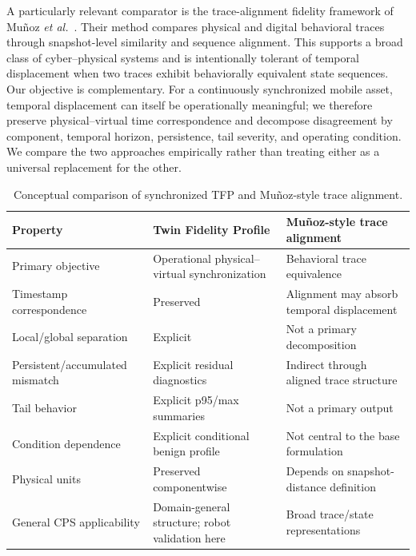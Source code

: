
A particularly relevant comparator is the trace-alignment fidelity framework
of Mu\~noz \emph{et al.}~\cite{munoz2024}. Their method compares physical and
digital behavioral traces through snapshot-level similarity and sequence
alignment. This supports a broad class of cyber--physical systems and is
intentionally tolerant of temporal displacement when two traces exhibit
behaviorally equivalent state sequences. Our objective is complementary. For
a continuously synchronized mobile asset, temporal displacement can itself be
operationally meaningful; we therefore preserve physical--virtual time
correspondence and decompose disagreement by component, temporal horizon,
persistence, tail severity, and operating condition. We compare the two
approaches empirically rather than treating either as a universal replacement
for the other.

\begin{table}[t]
\caption{Conceptual comparison of synchronized TFP and Mu\~noz-style trace alignment.}
\label{tab:tfp_munoz_concept}
\centering
\footnotesize
\begin{tabular}{p{}p{}p{}}
\toprule
Property & Twin Fidelity Profile & Mu\~noz-style trace alignment \\
\midrule
Primary objective & Operational physical--virtual synchronization & Behavioral trace equivalence \\
Timestamp correspondence & Preserved & Alignment may absorb temporal displacement \\
Local/global separation & Explicit & Not a primary decomposition \\
Persistent/accumulated mismatch & Explicit residual diagnostics & Indirect through aligned trace structure \\
Tail behavior & Explicit p95/max summaries & Not a primary output \\
Condition dependence & Explicit conditional benign profile & Not central to the base formulation \\
Physical units & Preserved componentwise & Depends on snapshot-distance definition \\
General CPS applicability & Domain-general structure; robot validation here & Broad trace/state representations \\
\bottomrule
\end{tabular}
\end{table}

